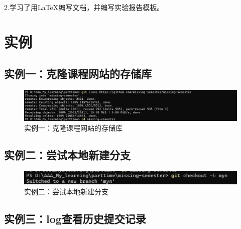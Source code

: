 \documentclass[a4paper]{article}
\begin{document}
2.学习了用LaTeX编写文档，并编写实验报告模板。

\section{实例}
\subsection{实例一：克隆课程网站的存储库}
    \begin{figure}[ht]
    \centering
    \includegraphics[width=1\textwidth]{images/clone.png}
    \caption{实例一：克隆课程网站的存储库}
    \label{fig:gitlog}
    \end{figure}
\subsection{实例二：尝试本地新建分支}
    \begin{figure}[ht]
    \centering
    \includegraphics[width=1\textwidth]{images/checkout.png}
    \caption{实例二：尝试本地新建分支}
    \label{fig:checkout}
    \end{figure}

\subsection{实例三：log查看历史提交记录}
\end{document}
